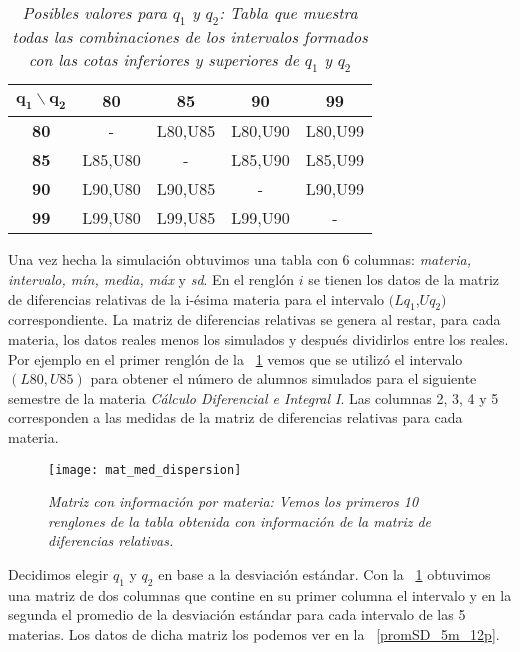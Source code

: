 \begin{table}[H]
\centering
\begin{tabular}{|c|c|c|c|c|}
\hline 
$\textbf{q}_{\textbf{1}} \backslash \textbf{q}_{\textbf{2}}$ & \textbf{80} & \textbf{85} & \textbf{90} & \textbf{99} \\ 
\hline 
\textbf{80} & - & L80,U85 & L80,U90 & L80,U99 \\ 
\hline 
\textbf{85} & L85,U80 & - & L85,U90 & L85,U99 \\ 
\hline 
\textbf{90} & L90,U80 & L90,U85 & - & L90,U99 \\ 
\hline 
\textbf{99} & L99,U80 & L99,U85 & L99,U90 & - \\ 
\hline 
\end{tabular} 
\caption[\textit{Posibles valores para $q_{1}$ y $q_{2}$}]{\textit{Posibles valores para $q_{1}$ y $q_{2}$: Tabla que muestra todas las combinaciones de los intervalos formados con las cotas inferiores y superiores de $q_{1}$ y $q_{2}$}}\label{valoresQ1Q2}
\end{table}


Una vez hecha la simulación obtuvimos una tabla con 6 columnas: \textit{materia, intervalo, mín, media, máx} y \textit{sd}. En el renglón $i$ se tienen los datos de la matriz de diferencias relativas de la i-ésima materia para el intervalo $(Lq_{1}$,$Uq_{2})$ correspondiente. La matriz de diferencias relativas se genera al restar, para cada materia, los datos reales menos los simulados y después dividirlos entre los reales. Por ejemplo en el primer renglón de la \figurename{~\ref{matMedDispersion}} vemos que se utilizó el intervalo $(L80,U85)$ para obtener el número de alumnos simulados para el siguiente semestre de la materia \textit{Cálculo Diferencial e Integral I}. Las columnas 2, 3, 4 y 5 corresponden a las medidas de la matriz de diferencias relativas para cada materia.

\begin{figure}[H]
\centering
\texttt{[image: mat\_med\_dispersion]} %
\caption[\textit{Matriz con información por materia}]{\textit{Matriz con información por materia: Vemos los primeros 10 renglones de la tabla obtenida con información de la matriz de diferencias relativas.}}\label{matMedDispersion}
\end{figure}


Decidimos elegir $q_{1}$ y $q_{2}$ en base a la desviación estándar. Con la \figurename{~\ref{matMedDispersion}} obtuvimos una matriz de dos columnas que contine en su primer columna el intervalo y en la segunda el promedio de la desviación estándar para cada intervalo de las 5 materias. Los datos de dicha matriz los podemos ver en la \figurename{~\ref{promSD_5m_12p}}.

